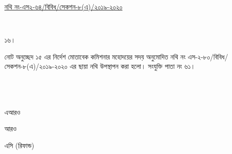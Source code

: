 \documentclass[12pt]{article}
\begin{document}
\begin{minipage}[t]{0.54\linewidth}
\hspace{0.5em}
\end{minipage}
\begin{minipage}[t]{\textwidth}
\underline{নথি নং-এস২-৬৪/বিবিধ/সেকশন-৮(এ)/২০১৯-২০২০}
\end{minipage}
\\
\large
\begin{minipage}[t]{0.05\linewidth}
১৬।
\end{minipage}
\begin{minipage}[t]{1\linewidth}
নোট অনুচ্ছেদ ১৫ এর নির্দেশ মোতাবেক
কমিশনার মহোদয়ের সদয় অনুমোদিত
নথি নং এস-২-৮০/বিবিধ/সেকশন-৮(এ)/২০১৯-২০২০
এর ছায়া নথি উপস্থাপন করা হলো।
সংযুক্তি পাতা নং ৬১।
\\
\\
\\
\\
\end{minipage}
\begin{minipage}[t]{.05\linewidth}
\hspace{1em}
\end{minipage}
\begin{minipage}[t]{.20\linewidth}
এআরও
\end{minipage}
\begin{minipage}[t]{.20\linewidth}
আরও
\end{minipage}
\begin{minipage}[t]{0.20\linewidth}
এসি (রিফান্ড)
\end{minipage}




\thispagestyle{laststyle}
\end{document}

